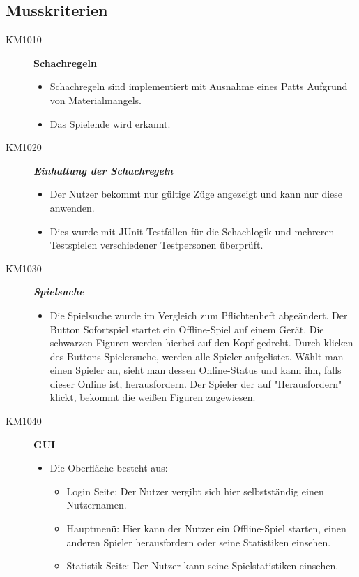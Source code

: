 \documentclass[parskip=full]{scrartcl}
\begin{document}
\subsection{Musskriterien}
\begin{description}
	\item[KM1010] \textbf{Schachregeln}
	\begin{itemize}
		\item Schachregeln sind implementiert mit Ausnahme eines Patts Aufgrund von Materialmangels.
		\item Das Spielende wird erkannt.
	\end{itemize}
	\item[KM1020] \textbf{\textit{Einhaltung der Schachregeln}}
	\begin{itemize}
		\item Der Nutzer bekommt nur gültige Züge angezeigt und kann nur diese anwenden.
		\item Dies wurde mit JUnit Testfällen für die Schachlogik und mehreren Testspielen verschiedener Testpersonen überprüft.
	\end{itemize}
	\item[KM1030] \textbf{\textit{Spielsuche}}
	\begin{itemize}
		\item Die Spielsuche wurde im Vergleich zum Pflichtenheft abgeändert.
		Der Button Sofortspiel startet ein Offline-Spiel auf einem Gerät. Die schwarzen Figuren werden hierbei auf den Kopf gedreht.
		Durch klicken des Buttons Spielersuche, werden alle Spieler aufgelistet.
		Wählt man einen Spieler an, sieht man dessen Online-Status und kann ihn, falls dieser Online ist, herausfordern. Der Spieler der auf "Herausfordern" klickt, bekommt die weißen Figuren zugewiesen.
	\end{itemize}
	\item[KM1040] \textbf{GUI}
	\begin{itemize}
		\item Die Oberfläche besteht aus:
		\begin{itemize}		
			\item Login Seite: Der Nutzer vergibt sich hier selbstständig einen Nutzernamen.
			
			\item Hauptmenü: Hier kann der Nutzer ein Offline-Spiel starten, einen anderen Spieler herausfordern oder seine Statistiken einsehen.
			
			\item Statistik Seite: Der Nutzer kann seine Spielstatistiken einsehen.
			

\end{itemize}
\end{itemize}
\end{description}
\end{document}
